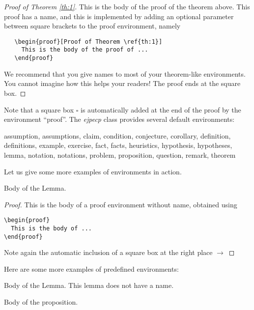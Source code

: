 \documentclass[ECP]{ejpecp} %
\begin{document}
 \begin{proof}[Proof of Theorem \ref{th:1}]
   This is the body of the proof of the theorem above. This proof has a name,
   and this is implemented by adding an optional parameter between square
   brackets to the proof environment, namely
   \begin{verbatim}
   \begin{proof}[Proof of Theorem \ref{th:1}] 
     This is the body of the proof of ... 
   \end{proof} 
   \end{verbatim}
   We recommend that you give names to most of your theorem-like environments.
   You cannot imagine how this helps your readers! The proof ends at the
   square box.
 \end{proof}

 Note that a square box $\square$ is automatically added at the end of the
 proof by the environment ``proof''. The \emph{ejpecp} class provides several
 default environments:
\begin{center}
  \small\ttfamily assumption, assumptions, claim, condition, conjecture,
  corollary, definition, definitions, example, exercise, fact, facts,
  heuristics, hypothesis, hypotheses, lemma, notation, notations, problem,
  proposition, question, remark, theorem
\end{center}

Let us give some more examples of environments in action.

 \begin{lemma}[My lemma]
   Body of the Lemma. 
 \end{lemma}

 \begin{proof}
   This is the body of a proof environment without name, obtained using
\begin{verbatim}
\begin{proof} 
  This is the body of ... 
\end{proof}
\end{verbatim}
   Note again the automatic inclusion of a square box at the right place $\to$
 \end{proof}

Here are some more examples of predefined environments:

 \begin{lemma}
   Body of the Lemma. This lemma does not have a name.
 \end{lemma}

 \begin{proposition}[My proposition]
   Body of the proposition.
 \end{proposition}
\end{document}
